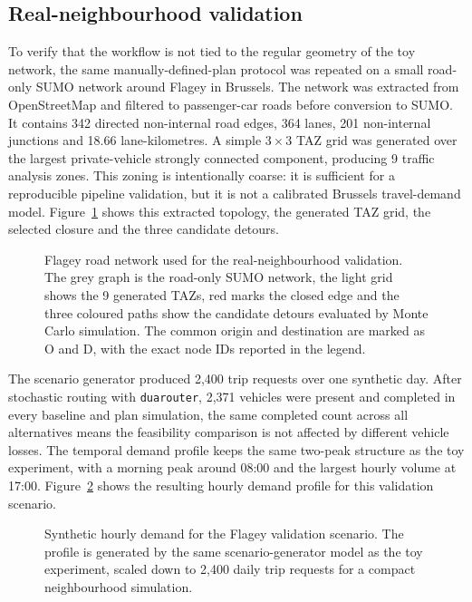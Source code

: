 \subsection{Real-neighbourhood validation}

To verify that the workflow is not tied to the regular geometry of the toy
network, the same manually-defined-plan protocol was repeated on a small
road-only SUMO network around Flagey in Brussels. The network was extracted
from OpenStreetMap and filtered to passenger-car roads before conversion to
SUMO. It contains 342 directed non-internal road edges, 364 lanes,
201 non-internal junctions and 18.66 lane-kilometres. A simple $3\times3$
TAZ grid was generated over the largest private-vehicle strongly connected
component, producing 9 traffic analysis zones. This zoning is intentionally
coarse: it is sufficient for a reproducible pipeline validation, but it is
not a calibrated Brussels travel-demand model.
Figure~\ref{fig:results_flagey_network_detours} shows this extracted topology,
the generated TAZ grid, the selected closure and the three candidate detours.

\begin{figure}[H]
  \centering
  \caption{Flagey road network used for the real-neighbourhood validation.
  The grey graph is the road-only SUMO network, the light grid shows the 9
  generated TAZs, red marks the closed edge and the three coloured paths show
  the candidate detours evaluated by Monte Carlo simulation. The common
  origin and destination are marked as O and D, with the exact node IDs
  reported in the legend.}
  \label{fig:results_flagey_network_detours}
\end{figure}

The scenario generator produced 2,400 trip requests over one synthetic day.
After stochastic routing with \texttt{duarouter}, 2,371 vehicles were present
and completed in every baseline and plan simulation, the same completed count
across all alternatives means the feasibility comparison is not affected by
different vehicle losses. The temporal demand profile keeps the same
two-peak structure as the toy experiment, with a morning peak around 08:00
and the largest hourly volume at 17:00.
Figure~\ref{fig:results_flagey_hourly_demand} shows the resulting hourly
demand profile for this validation scenario.

\begin{figure}[H]
  \centering
  \caption{Synthetic hourly demand for the Flagey validation scenario. The
  profile is generated by the same scenario-generator model as the toy
  experiment, scaled down to 2,400 daily trip requests for a compact
  neighbourhood simulation.}
  \label{fig:results_flagey_hourly_demand}
\end{figure}

